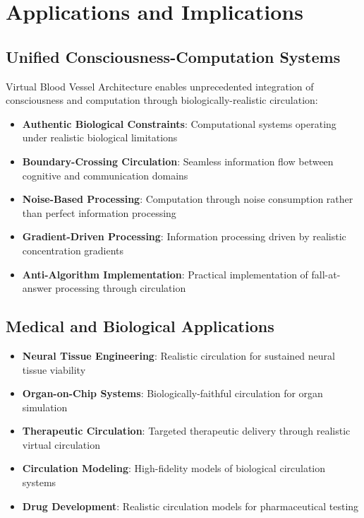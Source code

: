 \documentclass[12pt,a4paper]{article}
\begin{document}
\section{Applications and Implications}

\subsection{Unified Consciousness-Computation Systems}

Virtual Blood Vessel Architecture enables unprecedented integration of consciousness and computation through biologically-realistic circulation:

\begin{itemize}
\item \textbf{Authentic Biological Constraints}: Computational systems operating under realistic biological limitations
\item \textbf{Boundary-Crossing Circulation}: Seamless information flow between cognitive and communication domains
\item \textbf{Noise-Based Processing}: Computation through noise consumption rather than perfect information processing
\item \textbf{Gradient-Driven Processing}: Information processing driven by realistic concentration gradients
\item \textbf{Anti-Algorithm Implementation}: Practical implementation of fall-at-answer processing through circulation
\end{itemize}

\subsection{Medical and Biological Applications}

\begin{itemize}
\item \textbf{Neural Tissue Engineering}: Realistic circulation for sustained neural tissue viability
\item \textbf{Organ-on-Chip Systems}: Biologically-faithful circulation for organ simulation
\item \textbf{Therapeutic Circulation}: Targeted therapeutic delivery through realistic virtual circulation
\item \textbf{Circulation Modeling}: High-fidelity models of biological circulation systems
\item \textbf{Drug Development}: Realistic circulation models for pharmaceutical testing
\end{itemize}
\end{document}
